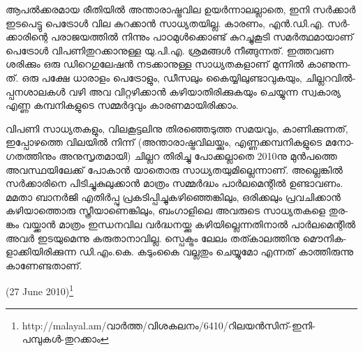 ആ­പല്‍­ക്ക­ര­മായ രീ­തി­യില്‍ അന്താ­രാ­ഷ്ട്ര­വില ഉയര്‍­ന്നാ­ല­ല്ലാ­തെ, ഇനി സര്‍­ക്കാര്‍ ഇട­പെ­ട്ടു ­പെ­ട്രോള്‍ വില കു­റ­ക്കാന്‍
സാ­ധ്യ­ത­യി­ല്ല. കാ­ര­ണം, എന്‍.­ഡി­.എ. സര്‍­ക്കാ­രി­ന്റെ പരാ­ജ­യ­ത്തില്‍ നി­ന്നും പാ­ഠ­മുള്‍­ക്കൊ­ണ്ട് കു­റ­ച്ചു­കൂ­ടി 
സമര്‍­ത്ഥ­മാ­യാ­ണ് പെ­ട്രോള്‍ വി­പ­ണി­തു­റ­ക്കാ­നു­ള്ള യു­.­പി­.എ. ശ്ര­മ­ങ്ങള്‍ നീ­ങ്ങു­ന്ന­ത്. ഇത്ത­വണ ശരി­ക്കും ഒരു 
ഡി­റെ­ഗു­ലേ­ഷന്‍ നട­ക്കാ­നു­ള്ള സാ­ധ്യ­ത­ക­ളാ­ണ് മു­ന്നില്‍ കാ­ണു­ന്ന­ത്. ഒരു പക്ഷേ ധാ­രാ­ളം പെ­ട്രോ­ളും, ഡീ­സ­ലും 
കൈ­യ്യി­ലു­ണ്ടാ­വു­ക­യും, ചി­ല്ല­റ­വില്‍­പ്പ­ന­ശാ­ല­കള്‍ വഴി അവ വി­റ്റ­ഴി­ക്കാന്‍ കഴി­യാ­തി­രി­ക്കു­ക­യും ചെ­യ്യു­ന്ന സ്വ­കാ­ര്യ 
എണ്ണ കമ്പ­നി­ക­ളു­ടെ സമ്മര്‍­ദ്ദ­വും കാ­ര­ണ­മാ­യി­രി­ക്കാം­.

­വി­പ­ണി സാ­ധ്യ­ത­ക­ളും, വി­ല­കൂ­ട്ട­ലി­നു തി­ര­ഞ്ഞെ­ടു­ത്ത സമ­യ­വും, കാ­ണി­ക്കു­ന്ന­ത്, ഇപ്പോ­ഴ­ത്തെ വി­ല­യില്‍ നി­ന്ന് 
(അ­ന്താ­രാ­ഷ്ട്ര­വി­ല­യ്ക്കും, എണ്ണ­ക്ക­മ്പ­നി­ക­ളു­ടെ മനോ­ഗ­ത­ത്തി­നും അനു­സൃ­ത­മാ­യി) ചി­ല്ലറ തി­രി­ച്ചു പോ­ക്ക­ല്ലാ­തെ 2010­നു 
മുന്‍­പ­ത്തെ അവ­സ്ഥ­യി­ലേ­ക്ക് പോ­കാന്‍ യാ­തൊ­രു സാ­ധ്യ­ത­യു­മി­ല്ലെ­ന്നാ­ണ്. അല്ലെ­ങ്കില്‍ സര്‍­ക്കാ­രി­നെ 
പി­ടി­ച്ചു­കു­ലു­ക്കാന്‍ മാ­ത്രം സമ്മര്‍­ദ്ധം പാര്‍­ല­മെ­ന്റില്‍ ഉണ്ടാ­വ­ണം. മമ­താ ബാ­നര്‍­ജി എതിര്‍­പ്പു പ്ര­ക­ടി­പ്പി­ച്ചു­ക­ഴി­ഞ്ഞെ­ങ്കി­ലും,
ഒരി­ക്ക­ലും പ്ര­വ­ചി­ക്കാന്‍ കഴി­യാ­ത്തൊ­രു സ്ത്രീ­യാ­ണെ­ങ്കി­ലും, ബം­ഗാ­ളി­ലെ അവ­രു­ടെ സാ­ധ്യ­ത­ക­ളെ തു­ര­ങ്കം വയ്ക്കാന്‍ മാ­ത്രം
ഇന്ധ­ന­വില വര്‍­ദ്ധ­ന­യ്ക്കു കഴി­യി­ല്ലെ­ന്ന­തി­നാല്‍ പാര്‍­ല­മെ­ന്റില്‍ അവര്‍ ഇട­യു­മെ­ന്നു കരു­താ­നാ­വി­ല്ല. സ്പെ­ക്ട്രം ലേ­ലം
തത്കാ­ല­ത്തി­നു മൌ­നി­ക­ളാ­ക്കി­യി­രി­ക്കു­ന്ന ഡി­.എം­.­കെ. കടും­കൈ വല്ല­തും ചെ­യ്യു­മോ എന്ന­ത് കാ­ത്തി­രു­ന്നു 
കാ­ണേ­ണ്ട­താ­ണ്.

(27 June 2010)\footnote{http://malayal.am/വാര്‍ത്ത/വിശകലനം/6410/റിലയന്‍സിന്-ഇനി-പമ്പുകള്‍-തുറക്കാം}

\newpage
